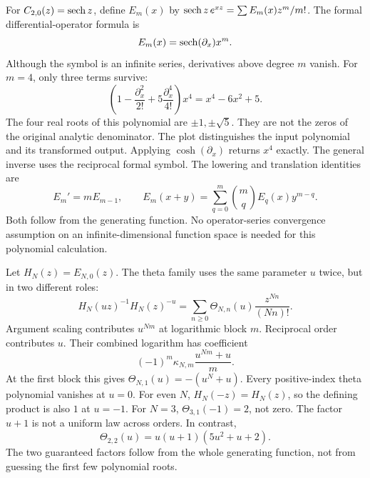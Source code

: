 For $C_{2,0}(z)=\operatorname{sech} z$, define $E_m(x)$ by $\operatorname{sech} z\,e^{xz}=\sum E_m(x)z^m/m!$. The formal differential-operator formula is
\[
E_m(x)=\operatorname{sech}(\partial_x)x^m.
\]
Although the symbol is an infinite series, derivatives above degree $m$ vanish.
For $m=4$, only three terms survive:
\[
\left(1-\frac{\partial_x^2}{2!}+5\frac{\partial_x^4}{4!}\right)x^4
=x^4-6x^2+5.
\]
The four real roots of this polynomial are $\pm1,\pm\sqrt5$. They are not the zeros of the original analytic denominator. The plot distinguishes the input polynomial and its transformed output.
Applying $\cosh(\partial_x)$ returns $x^4$ exactly. The general inverse uses the reciprocal formal symbol. The lowering and translation identities are
\[
E_m'=mE_{m-1},\qquad E_m(x+y)=\sum_{q=0}^m\binom mqE_q(x)y^{m-q}.
\]
Both follow from the generating function. No operator-series convergence assumption on an infinite-dimensional function space is needed for this polynomial calculation.

Let $H_N(z)=E_{N,0}(z)$. The theta family uses the same parameter $u$ twice, but in two different roles:
\[
H_N(uz)^{-1}H_N(z)^{-u}
=\sum_{n\ge0}\Theta_{N,n}(u)\frac{z^{Nn}}{(Nn)!}.
\]
Argument scaling contributes $u^{Nm}$ at logarithmic block $m$. Reciprocal order contributes $u$.
Their combined logarithm has coefficient
\[
(-1)^m\kappa_{N,m}\frac{u^{Nm}+u}{m}.
\]
At the first block this gives $\Theta_{N,1}(u)=-(u^N+u)$. Every positive-index theta polynomial vanishes at $u=0$. For even $N$, $H_N(-z)=H_N(z)$, so the defining product is also $1$ at $u=-1$.
For $N=3$, $\Theta_{3,1}(-1)=2$, not zero. The factor $u+1$ is not a uniform law across orders. In contrast,
\[
\Theta_{2,2}(u)=u(u+1)(5u^2+u+2).
\]
The two guaranteed factors follow from the whole generating function, not from guessing the first few polynomial roots.

